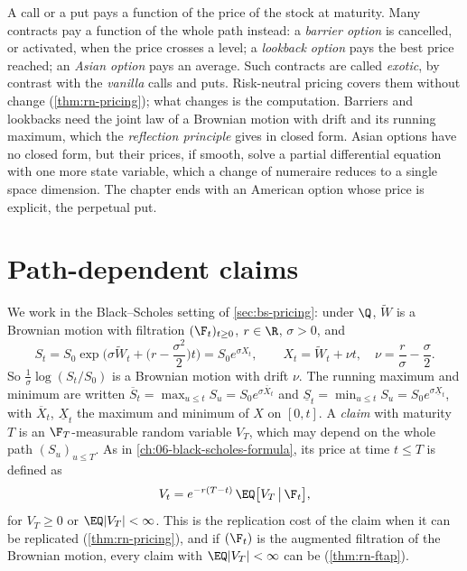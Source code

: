 
A call or a put pays a function of the price of the stock at maturity. Many contracts pay a
function of the whole path instead: a \emph{barrier option} is cancelled, or activated, when
the price crosses a level; a \emph{lookback option} pays the best price reached; an
\emph{Asian option} pays an average. Such contracts are called \emph{exotic}, by contrast
with the \emph{vanilla} calls and puts. Risk-neutral pricing covers them without change
(\cref{thm:rn-pricing}); what changes is the computation. Barriers and lookbacks need the joint law of a Brownian motion with drift
and its running maximum, which the \emph{reflection principle} gives in closed form. Asian
options have no closed form, but their prices, if smooth, solve a partial differential equation
with one more state variable, which a change of numeraire reduces to a single space dimension. The
chapter ends with an American option whose price is explicit, the perpetual put.

\section{Path-dependent claims}\label{sec:exo-setting}

We work in the Black--Scholes setting of \cref{sec:bs-pricing}: under $\Q$, $\widetilde W$ is a
Brownian motion with filtration $(\F_t)_{t\ge0}$, $r\in\R$, $\sigma>0$, and
\begin{equation}\label{eq:exo-X}
  S_t=S_0\exp\Big(\sigma\widetilde W_t+\Big(r-\frac{\sigma^2}2\Big)t\Big)=S_0e^{\sigma X_t},\qquad
  X_t=\widetilde W_t+\nu t,\quad \nu=\frac r\sigma-\frac\sigma2 .
\end{equation}
So $\frac1\sigma\log(S_t/S_0)$ is a Brownian motion with drift $\nu$. The running maximum and
minimum are written $\overline S_t=\max_{u\le t}S_u=S_0e^{\sigma\overline X_t}$ and
$\underline S_t=\min_{u\le t}S_u=S_0e^{\sigma\underline X_t}$, with $\overline X_t$, $\underline X_t$
the maximum and minimum of $X$ on $[0,t]$. A \emph{claim} with maturity $T$ is an
$\F_T$-measurable random variable $V_T$, which may depend on the whole path $(S_u)_{u\le T}$.
As in \cref{ch:06-black-scholes-formula}, its price at time $t\le T$ is defined as
\begin{equation}\label{eq:exo-price}
  V_t=e^{-r(T-t)}\,\EQ\big[V_T\,\big|\,\F_t\big],
\end{equation}
for $V_T\ge0$ or $\EQ|V_T|<\infty$. This is the replication cost of the claim when it can be
replicated (\cref{thm:rn-pricing}), and if $(\F_t)$ is the augmented filtration of the Brownian
motion, every claim with $\EQ|V_T|<\infty$ can be (\cref{thm:rn-ftap}).


